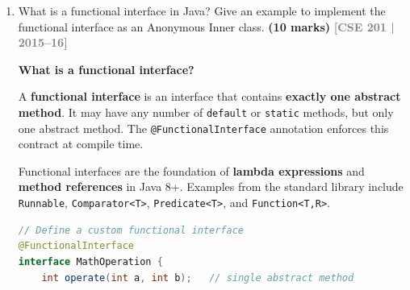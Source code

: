 \documentclass[12pt,a3paper]{article}
\newcommand{\yr}[1]{\hfill\textcolor{gray}{\small\textbf{[#1]}}}
\newcommand{\mk}[1]{\textcolor{orange!70!black}{\small\textbf{(#1 marks)}}}
\begin{document}
\begin{enumerate}
\begin{tcolorbox}
\begin{lstlisting}[language=Java]
    GOT(String status, int seasons) {
        this.status = status;
        this.seasons = seasons;
    }

    public int getSeasons() { return seasons; }
}

public class Main {
    public static void main(String[] args) {

        // Find character with least seasons (cannot simply write Ned Stark)
        GOT least = GOT.values()[0];
        for (GOT c : GOT.values())
            if (c.getSeasons() < least.getSeasons())
                least = c;

        System.out.println("Least active: " + least.name()
            + " (" + least.getSeasons() + " season(s))");
    }
}
\end{lstlisting}

\textbf{Output:}
\begin{lstlisting}
Least active: NED_STARK (1 season(s))
\end{lstlisting}

\end{tcolorbox}


\item What is a functional interface in Java? Give an example to implement the functional interface as an Anonymous Inner class. \mk{10}
\yr{CSE 201 | 2015--16}

\begin{tcolorbox}[enhanced,breakable,ansbox,
  colback=cH!4,colframe=cH,boxrule=0.8pt,arc=5pt,
  title={\textbf{Answer — Functional Interface and
  Anonymous Inner Class}},
  fonttitle=\bfseries\color{white},colbacktitle=cH]

\textbf{What is a functional interface?}

A \textbf{functional interface} is an interface that
contains \textbf{exactly one abstract method}. It
may have any number of \texttt{default} or
\texttt{static} methods, but only one abstract
method. The \texttt{@FunctionalInterface} annotation
enforces this contract at compile time.

Functional interfaces are the foundation of
\textbf{lambda expressions} and
\textbf{method references} in Java 8+. Examples
from the standard library include
\texttt{Runnable}, \texttt{Comparator<T>},
\texttt{Predicate<T>}, and \texttt{Function<T,R>}.

\begin{lstlisting}[language=Java]
// Define a custom functional interface
@FunctionalInterface
interface MathOperation {
    int operate(int a, int b);   // single abstract method


\end{lstlisting}
\end{tcolorbox}
\end{enumerate}
\end{document}
